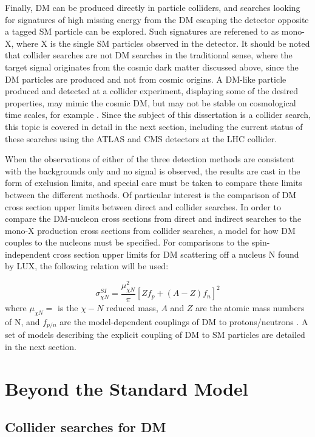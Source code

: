 \indent Finally, DM can be produced directly in particle colliders, and searches looking for signatures of high missing energy from the DM escaping the detector opposite a tagged SM particle can be explored. Such signatures are referened to as mono-X, where X is the single SM particles observed in the detector. It should be noted that collider searches are not DM searches in the traditional sense, where the target signal originates from the cosmic dark matter discussed above, since the DM particles are produced and not from cosmic origins. A DM-like particle produced and detected at a collider experiment, displaying some of the desired properties, may mimic the cosmic DM, but may not be stable on cosmological time scales, for example \cite{Askew:2014kqa}. Since the subject of this dissertation is a collider search, this topic is covered in detail in the next section, including the current status of these searches using the ATLAS and CMS detectors at the LHC collider. 

\indent When the observations of either of the three detection methods are consistent with the backgrounds only and no signal is observed, the results are cast in the form of exclusion limits, and special care must be taken to compare these limits between the different methods. Of particular interest is the comparison of DM cross section upper limits between direct and collider searches. In order to compare the DM-nucleon cross sections from direct and indirect searches to the mono-X production cross sections from collider searches, a model for how DM couples to the nucleons must be specified. For comparisons to the spin-independent cross section upper limits for DM scattering off a nucleus N found by LUX, the following relation will be used:

\begin{equation}
\sigma^{SI}_{\chi N} = \frac{\mu^2_{\chi N}}{\pi} [Zf_p + (A-Z)f_n]^2
\end{equation}
where $\mu_{\chi N} = $ is the $\chi-N$ reduced mass, $A$ and $Z$ are the atomic mass numbers of N, and $f_{p/n}$ are the model-dependent couplings of DM to protons/neutrons \cite{Carpenter:2013xra}. A set of models describing the explicit coupling of DM to SM particles are detailed in the next section.

\section{Beyond the Standard Model}

\subsection{Collider searches for DM}

